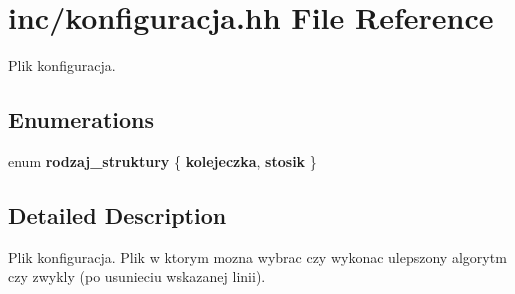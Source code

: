 \hypertarget{konfiguracja_8hh}{\section{inc/konfiguracja.hh File Reference}
\label{konfiguracja_8hh}
}


Plik konfiguracja.  


\subsection*{Enumerations}
\begin{DoxyCompactItemize}
\item 
enum {\bfseries rodzaj\-\_\-struktury} \{ {\bfseries kolejeczka}, 
{\bfseries stosik}
 \}
\end{DoxyCompactItemize}


\subsection{Detailed Description}
Plik konfiguracja. Plik w ktorym mozna wybrac czy wykonac ulepszony algorytm czy zwykly (po usunieciu wskazanej linii). 